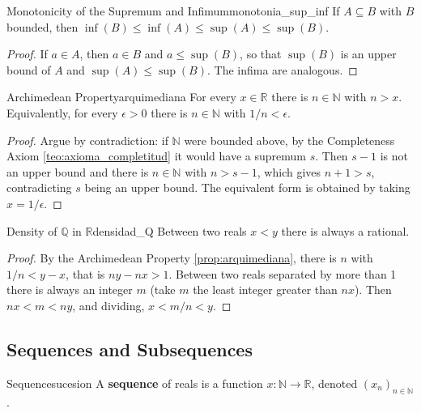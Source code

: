 \documentclass[11pt, a4paper]{article}
\begin{document}
\begin{proposicion}{Monotonicity of the Supremum and Infimum}{monotonia_sup_inf}
If $A \subseteq B$ with $B$ bounded, then $\inf(B) \le \inf(A) \le \sup(A) \le \sup(B)$.
\end{proposicion}

\begin{proof}
If $a \in A$, then $a \in B$ and $a \le \sup(B)$, so that $\sup(B)$ is an upper bound of $A$ and
$\sup(A) \le \sup(B)$. The infima are analogous.
\end{proof}

\begin{proposicion}{Archimedean Property}{arquimediana}
For every $x \in \mathbb{R}$ there is $n \in \mathbb{N}$ with $n > x$. Equivalently, for every
$\epsilon > 0$ there is $n \in \mathbb{N}$ with $1/n < \epsilon$.
\end{proposicion}

\begin{proof}
Argue by contradiction: if $\mathbb{N}$ were bounded above, by the Completeness Axiom
\ref{teo:axioma_completitud} it would have a supremum $s$.
Then $s - 1$ is not an upper bound and there is $n \in \mathbb{N}$ with $n > s - 1$, which gives
$n + 1 > s$, contradicting $s$ being an upper bound. The equivalent form is obtained by taking
$x = 1/\epsilon$.
\end{proof}

\begin{proposicion}{Density of $\mathbb{Q}$ in $\mathbb{R}$}{densidad_Q}
Between two reals $x < y$ there is always a rational.
\end{proposicion}

\begin{proof}
By the Archimedean Property \ref{prop:arquimediana}, there is $n$ with $1/n < y - x$, that is
$ny - nx > 1$. Between two reals separated by
more than 1 there is always an integer $m$ (take $m$ the least integer greater than $nx$). Then
$nx < m < ny$, and dividing, $x < m/n < y$.
\end{proof}

\subsection{Sequences and Subsequences}

\begin{definicion}{Sequence}{sucesion}
A \textbf{sequence} of reals is a function $x: \mathbb{N} \to \mathbb{R}$, denoted
$(x_n)_{n \in \mathbb{N}}$.
\end{definicion}
\end{document}
